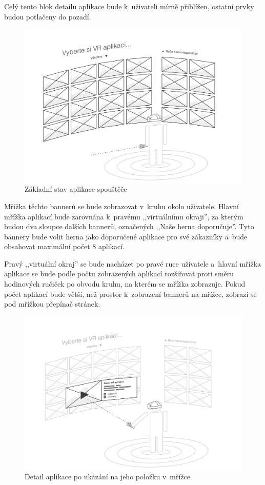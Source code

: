 Celý tento blok
detailu aplikace bude k~uživateli mírně přiblížen, ostatní prvky budou
potlačeny do pozadí.

\begin{figure}[h!]
\centering
\includegraphics[width=\textwidth]{src/assets/wireframe-grid.pdf}
\caption{Základní stav aplikace spouštěče}
\end{figure}

Mřížka těchto bannerů se bude zobrazovat v~kruhu okolo uživatele. Hlavní
mřížka aplikací bude zarovnána k~pravému ,,virtuálnímu okraji'', za
kterým budou dva sloupce dalších bannerů, označených ,,Naše herna
doporučuje''. Tyto bannery bude volit herna jako doporučené aplikace pro
své zákazníky a~bude obsahovat maximální počet 8 aplikací. 

Pravý ,,virtuální okraj'' se bude nacházet po pravé ruce uživatele a~hlavní
mřížka aplikace se bude podle počtu zobrazených aplikací rozšiřovat
proti směru hodinových ručiček po obvodu kruhu, na kterém se mřížka
zobrazuje. Pokud počet aplikací bude větší, než prostor k~zobrazení
bannerů na mřížce, zobrazí se pod mřížkou přepínač stránek.

\begin{figure}[h!]
\centering
\includegraphics[width=\textwidth]{src/assets/wireframe-detail.pdf}
\caption{Detail aplikace po ukázání na jeho položku v~mřížce}
\end{figure}

